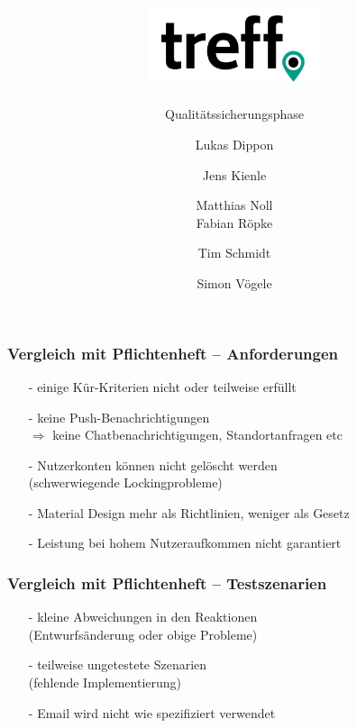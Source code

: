 \documentclass[aspectratio=1610]{beamer}
\title{\includegraphics[width = 50mm]{images/logo_crop.png}}
\subtitle{\huge Qualitätssicherungsphase}
\author{Lukas Dippon
	\and Jens Kienle
	\and Matthias Noll
    \\Fabian Röpke
	\and Tim Schmidt
	\and Simon Vögele}
\begin{document}
	\begin{frame}[plain]
	\maketitle
	\end{frame}


	\begin{frame}[plain]
        \frametitle{\textbf{Vergleich mit Pflichtenheft} -- Anforderungen}

        \begin{itemize}
          \item[-] einige Kür-Kriterien nicht oder teilweise erfüllt
          \item[-] keine Push-Benachrichtigungen \\
                   $\Rightarrow$ keine Chatbenachrichtigungen,
                   Standortanfragen etc
          \item[-] Nutzerkonten können nicht gelöscht werden \\
                   (schwerwiegende Lockingprobleme)
          \item[-] Material Design mehr als Richtlinien, weniger als Gesetz
          \item[-] Leistung bei hohem Nutzeraufkommen nicht garantiert
        \end{itemize}

  \end{frame}

  \begin{frame}[plain]
        \frametitle{\textbf{Vergleich mit Pflichtenheft} -- Testszenarien}

        \begin{itemize}
          \item[-] kleine Abweichungen in den Reaktionen \\
                   (Entwurfsänderung oder obige Probleme)
          \item[-] teilweise ungetestete Szenarien \\
                   (fehlende Implementierung)
          \item[-] Email wird nicht wie spezifiziert verwendet
        \end{itemize}

  \end{frame}

\end{document}
